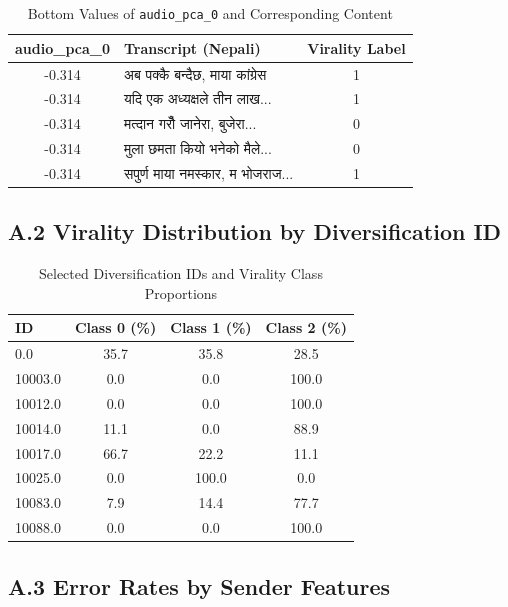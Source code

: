 \documentclass[12pt,a4paper]{report}
\begin{document}
\begin{table}[H]
\centering
\caption{Bottom Values of \texttt{audio\_pca\_0} and Corresponding Content}
\label{tab:audio_pca_low}
\begin{tabular}{clc}
\toprule
\textbf{audio\_pca\_0} & \textbf{Transcript (Nepali)} & \textbf{Virality Label} \\
\midrule
-0.314 & \texthindi{अब पक्कै बन्दैछ, माया कांग्रेस} & 1 \\
-0.314 & \texthindi{यदि एक अध्यक्षले तीन लाख...} & 1 \\
-0.314 & \texthindi{मत्दान गरौँ जानेरा, बुजेरा...} & 0 \\
-0.314 & \texthindi{मुला छमता कियो भनेको मैले...} & 0 \\
-0.314 & \texthindi{सपुर्ण माया नमस्कार, म भोजराज...} & 1 \\
\bottomrule
\end{tabular}
\end{table}

\subsection*{A.2 Virality Distribution by Diversification ID}

\begin{table}[H]
\centering
\caption{Selected Diversification IDs and Virality Class Proportions}
\label{tab:div_id_count}
\begin{tabular}{lccc}
\toprule
\textbf{ID} & \textbf{Class 0 (\%)} & \textbf{Class 1 (\%)} & \textbf{Class 2 (\%)} \\
\midrule
0.0 & 35.7 & 35.8 & 28.5 \\
10003.0 & 0.0 & 0.0 & 100.0 \\
10012.0 & 0.0 & 0.0 & 100.0 \\
10014.0 & 11.1 & 0.0 & 88.9 \\
10017.0 & 66.7 & 22.2 & 11.1 \\
10025.0 & 0.0 & 100.0 & 0.0 \\
10083.0 & 7.9 & 14.4 & 77.7 \\
10088.0 & 0.0 & 0.0 & 100.0 \\
\bottomrule
\end{tabular}
\end{table}

\subsection*{A.3 Error Rates by Sender Features}
\end{document}
